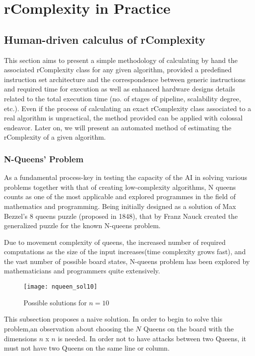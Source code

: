 \chapter{rComplexity in Practice}


\section{Human-driven calculus of rComplexity}
This section aims to present a simple methodology of calculating by hand the associated rComplexity class for any given algorithm, provided a predefined instruction set architecture and the correspondence between generic instructions and required time for execution as well as enhanced hardware designs details related to the total execution time (no. of stages of pipeline, scalability degree, etc.)\cite{hennessy2011computer}. Even if the process of calculating an exact rComplexity class associated to a real algorithm is unpractical, the method provided can be applied with colossal endeavor. Later on, we will present an automated method of estimating the rComplexity of a given algorithm.

\subsection{N-Queens’ Problem}


As a fundamental process-key in testing the capacity of the AI in solving various problems together with that of creating low-complexity algorithms, N queens counts as one of the most applicable and explored programmes in the field of mathematics and programming. Being initially designed as a solution of Max Bezzel’s 8 queens puzzle (proposed in 1848), that by Franz Nauck created the generalized puzzle for the known N-queens problem.

Due to movement complexity of queens, the increased number of required computations as the size of the input increases(time complexity grows fast), and the vast number of possible board states, N-queens problem has been explored by mathematicians and programmers quite extensively.

\begin{figure}[H]
    \centering
    \texttt{[image: nqueen\_sol10]}
    \caption{Possible solutions for $n=10$}
\end{figure}

This subsection proposes a naive solution. In order to begin to solve this problem,an observation about choosing the $N$ Queens on the board with the dimensions $n$ x $n$ is needed. In order not to have attacks between two Queens, it must not have two Queens on the same line or column.


